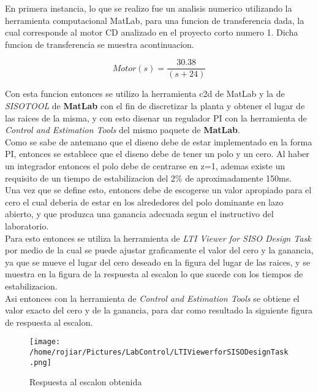\documentclass[a4paper,10pt,twocolumn]{article}
\begin{document}
En primera instancia, lo que se realizo fue un analisis numerico utilizando la herramienta computacional MatLab, para una funcion de 
transferencia dada, la cual corresponde al motor CD analizado en el proyecto corto numero 1. Dicha funcion de transferencia se muestra
acontinuacion. 

\begin{center}
$$
 Motor(s) = \frac{30.38}{(s+24)}
$$
\end{center}

Con esta funcion entonces se utilizo la herramienta c2d de MatLab y la de \textit{SISOTOOL} de \textbf{MatLab} con el fin de discretizar la planta y
obtener el lugar de las raices de la misma, y con esto disenar un regulador PI con la herramienta de \textit{Control and Estimation Tools} 
del mismo paquete de \textbf{MatLab}.\\

Como se sabe de antemano que el diseno debe de estar implementado en la forma PI, entonces se establece que el diseno debe de tener 
un polo y un cero. Al haber un integrador entonces el polo debe de centrarse en z=1, ademas existe un requisito de un tiempo de estabilizacion
del 2\% de aproximadamente 150ms.\\

Una vez que se define esto, entonces debe de escogerse un valor apropiado para el cero el cual deberia de estar en los alrededores del polo
dominante en lazo abierto, y que produzca una ganancia adecuada segun el instructivo del laboratorio.\\

Para esto entonces se utiliza la herramienta de \textit{LTI Viewer for SISO Design Task} por medio de la cual se puede ajustar graficamente
el valor del cero y la ganancia, ya que se mueve el lugar del cero deseado en la figura del lugar de las raices, y se muestra en la figura de
la respuesta al escalon lo que sucede con los tiempos de estabilizacion.\\

Asi entonces con la herramienta de \textit{Control and Estimation Tools} se obtiene el valor exacto del cero y de la ganancia, para dar como
resultado la siguiente figura de respuesta al escalon.

\newpage

\begin{figure}[h!]
\centering
\texttt{[image: /home/rojiar/Pictures/LabControl/LTIViewerforSISODesignTask.png]}
\caption{Respuesta al escalon obtenida}
\label{Respuesta al escalon obtenida}
\end{figure}
\end{document}
